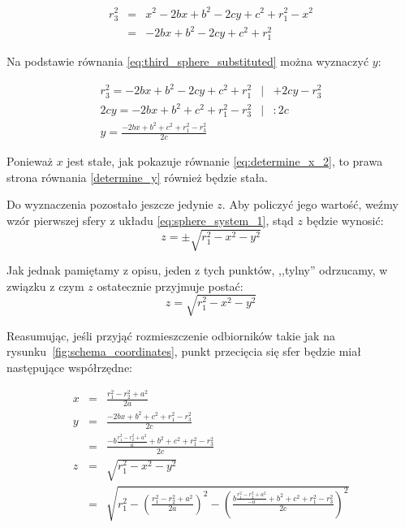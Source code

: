 \begin{eqnarray}
r_3^2 & = & x^2 - 2bx + b^2 - 2cy + c^2 + r_1^2 - x^2 \label{eq:third_sphere_substituted} \\
      & = & -2bx + b^2 - 2cy + c^2 + r_1^2 \nonumber
\end{eqnarray}

Na podstawie równania \ref{eq:third_sphere_substituted} można wyznaczyć $y$:

\begin{eqnarray}
 r_3^2 = -2bx + b^2 - 2cy + c^2 + r_1^2 & | & +2cy - r_3^2 \\
 2cy = -2bx + b^2 + c^2 + r_1^2 - r_3^2 & | & \colon 2c \\
 y   = \frac{-2bx + b^2 + c^2 + r_1^2 - r_3^2}{2c} \label{determine_y}
\end{eqnarray}

Ponieważ $x$ jest stałe, jak pokazuje równanie \ref{eq:determine_x_2}, to prawa strona równania \ref{determine_y} również będzie stała.

Do wyznaczenia pozostało jeszcze jedynie $z$. Aby policzyć jego wartość, weźmy wzór pierwszej sfery z układu \ref{eq:sphere_system_1}, stąd $z$ będzie wynosić:
\begin{equation}
 z = \pm\sqrt{r_1^2 - x^2 - y^2}
\end{equation}

Jak jednak pamiętamy z opisu, jeden z tych punktów, ,,tylny'' odrzucamy, w związku z czym $z$ ostatecznie przyjmuje postać:
\begin{equation}
 z = \sqrt{r_1^2 - x^2 - y^2}
\end{equation}

Reasumując, jeśli przyjąć rozmieszczenie odbiorników takie jak na rysunku~\ref{fig:schema_coordinates}, punkt przecięcia się sfer będzie miał następujące współrzędne:

\begin{eqnarray}
 x & = & \frac{r_1^2 - r_2^2 + a^2}{2a} \label{eq:trilateration_final_x}\\
 y & = & \frac{-2bx + b^2 + c^2 + r_1^2 - r_3^2}{2c} \label{eq:trilateration_final_y}\\
   & = & \frac{-b\frac{r_1^2 - r_2^2 + a^2}{a} + b^2 + c^2 + r_1^2 - r_3^2}{2c} \nonumber \\
 z & = & \sqrt{r_1^2 - x^2 - y^2} \label{eq:trilateration_final_z}\\
   & = & \sqrt{r_1^2 - \left(\frac{r_1^2 - r_2^2 + a^2}{2a}\right)^2 - \left(\frac{b\frac{r_1^2 - r_2^2 + a^2}{-a} + b^2 + c^2 + r_1^2 - r_3^2}{2c}\right)^2} \nonumber
\end{eqnarray}

